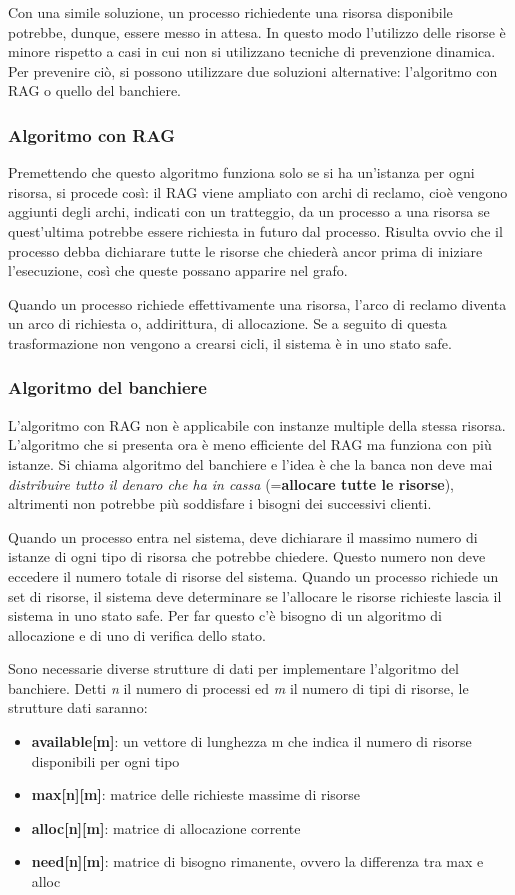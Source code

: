 \documentclass[a4paper]{article}
\begin{document}
Con una simile soluzione, un processo richiedente una risorsa disponibile potrebbe, dunque, essere messo in attesa. In questo modo l'utilizzo delle risorse è minore rispetto a casi in cui non si utilizzano tecniche di prevenzione dinamica. Per prevenire ciò, si possono utilizzare due soluzioni alternative: l'algoritmo con RAG o quello del banchiere.

\subsubsection{Algoritmo con RAG}
Premettendo che questo algoritmo funziona solo se si ha un'istanza per ogni risorsa, si procede così: il RAG viene ampliato con archi di reclamo, cioè vengono aggiunti degli archi, indicati con un tratteggio, da un processo a una risorsa se quest'ultima potrebbe essere richiesta in futuro dal processo. Risulta ovvio che il processo debba dichiarare tutte le risorse che chiederà ancor prima di iniziare l'esecuzione, così che queste possano apparire nel grafo.

Quando un processo richiede effettivamente una risorsa, l'arco di reclamo diventa un arco di richiesta o, addirittura, di allocazione. Se a seguito di questa trasformazione non vengono a crearsi cicli, il sistema è in uno stato safe.

\subsubsection{Algoritmo del banchiere}
L'algoritmo con RAG non è applicabile con instanze multiple della stessa risorsa. L'algoritmo che si presenta ora è meno efficiente del RAG ma funziona con più istanze. Si chiama algoritmo del banchiere e l'idea è che la banca non deve mai \textit{distribuire tutto il denaro che ha in cassa} (=\textbf{allocare tutte le risorse}), altrimenti non potrebbe più soddisfare i bisogni dei successivi clienti.

Quando un processo entra nel sistema, deve dichiarare il massimo numero di istanze di ogni tipo di risorsa che potrebbe chiedere. Questo numero non deve eccedere il numero totale di risorse del sistema. Quando un processo richiede un set di risorse, il sistema deve determinare se l'allocare le risorse richieste lascia il sistema in uno stato safe. Per far questo c'è bisogno di un algoritmo di allocazione e di uno di verifica dello stato.

Sono necessarie diverse strutture di dati per implementare l'algoritmo del banchiere. Detti \textit{n} il numero di processi ed \textit{m} il numero di tipi di risorse, le strutture dati saranno:
\begin{itemize}
    \item \textbf{available[m]}: un vettore di lunghezza m che indica il numero di risorse disponibili per ogni tipo
    \item \textbf{max[n][m]}: matrice delle richieste massime di risorse
    \item \textbf{alloc[n][m]}: matrice di allocazione corrente
    \item \textbf{need[n][m]}: matrice di bisogno rimanente, ovvero la differenza tra max e alloc
\end{itemize}
\end{document}

